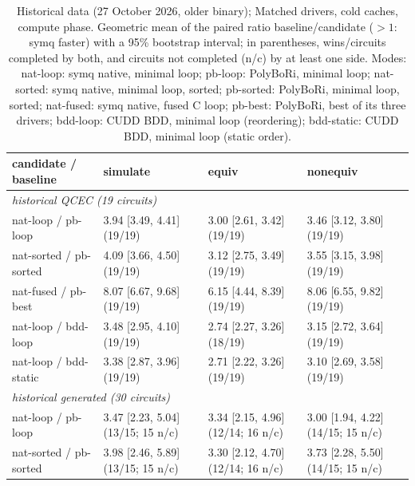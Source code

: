 \begin{table}[t]
\centering\scriptsize
\setlength{\tabcolsep}{4pt}
\caption{Historical data (27 October 2026, older binary); Matched drivers, cold caches, compute phase. Geometric mean of the paired ratio baseline/candidate ($>1$: symq faster) with a 95\% bootstrap interval; in parentheses, wins/circuits completed by both, and circuits not completed (n/c) by at least one side. Modes: \textsf{nat-loop}: symq native, minimal loop; \textsf{pb-loop}: PolyBoRi, minimal loop; \textsf{nat-sorted}: symq native, minimal loop, sorted; \textsf{pb-sorted}: PolyBoRi, minimal loop, sorted; \textsf{nat-fused}: symq native, fused C loop; \textsf{pb-best}: PolyBoRi, best of its three drivers; \textsf{bdd-loop}: CUDD BDD, minimal loop (reordering); \textsf{bdd-static}: CUDD BDD, minimal loop (static order).}
\label{tab:matched}
\begin{tabular}{llll}
\toprule
candidate / baseline & simulate & equiv & nonequiv \\
\midrule
\multicolumn{4}{l}{\emph{historical QCEC (19 circuits)}} \\
\textsf{nat-loop} / \textsf{pb-loop} & 3.94 [3.49, 4.41]\,{\scriptsize(19/19)} & 3.00 [2.61, 3.42]\,{\scriptsize(19/19)} & 3.46 [3.12, 3.80]\,{\scriptsize(19/19)} \\
\textsf{nat-sorted} / \textsf{pb-sorted} & 4.09 [3.66, 4.50]\,{\scriptsize(19/19)} & 3.12 [2.75, 3.49]\,{\scriptsize(19/19)} & 3.55 [3.15, 3.98]\,{\scriptsize(19/19)} \\
\textsf{nat-fused} / \textsf{pb-best} & 8.07 [6.67, 9.68]\,{\scriptsize(19/19)} & 6.15 [4.44, 8.39]\,{\scriptsize(19/19)} & 8.06 [6.55, 9.82]\,{\scriptsize(19/19)} \\
\textsf{nat-loop} / \textsf{bdd-loop} & 3.48 [2.95, 4.10]\,{\scriptsize(19/19)} & 2.74 [2.27, 3.26]\,{\scriptsize(18/19)} & 3.15 [2.72, 3.64]\,{\scriptsize(19/19)} \\
\textsf{nat-loop} / \textsf{bdd-static} & 3.38 [2.87, 3.96]\,{\scriptsize(19/19)} & 2.71 [2.22, 3.26]\,{\scriptsize(19/19)} & 3.10 [2.69, 3.58]\,{\scriptsize(19/19)} \\
\midrule
\multicolumn{4}{l}{\emph{historical generated (30 circuits)}} \\
\textsf{nat-loop} / \textsf{pb-loop} & 3.47 [2.23, 5.04]\,{\scriptsize(13/15; 15 n/c)} & 3.34 [2.15, 4.96]\,{\scriptsize(12/14; 16 n/c)} & 3.00 [1.94, 4.22]\,{\scriptsize(14/15; 15 n/c)} \\
\textsf{nat-sorted} / \textsf{pb-sorted} & 3.98 [2.46, 5.89]\,{\scriptsize(13/15; 15 n/c)} & 3.30 [2.12, 4.70]\,{\scriptsize(12/14; 16 n/c)} & 3.73 [2.28, 5.50]\,{\scriptsize(14/15; 15 n/c)} \\

\end{tabular}
\end{table}
